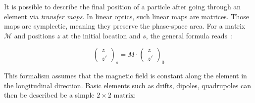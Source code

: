 \subsubsection{}
\label{section:coordinate_systems:linear_maps}

It is possible to describe the final position of a particle after going through an element via
\textit{transfer maps}. In linear optics, such linear maps are matrices. Those maps are symplectic,
meaning they preserve the phase-space area. For a matrix $\mathcal{M}$ and positions $z$ at the
initial location and $s$, the general formula reads~\cite{lee_accelerator_2004}:

\begin{equation}
    \begin{pmatrix}
        z \\
        z'
    \end{pmatrix}_s
    = M \cdot 
    \begin{pmatrix}
        z \\
        z'
    \end{pmatrix}_0
\end{equation}

This formalism assumes that the magnetic field is constant along the element in the longitudinal
direction. Basic elements such as drifts, dipoles, quadrupoles can then be described be a simple
$2 \times 2$ matrix:

